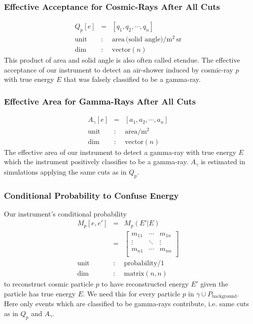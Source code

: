 \documentclass{article}%
\begin{document}
\subsubsection*{Effective Acceptance for Cosmic-Rays After All Cuts}
\begin{eqnarray*}
Q_p[e] &=& [q_1, q_2, \cdots, q_n]\\
\text{unit} &:& \text{area} \, \text{(solid angle)} / \text{m}^{2}\,\text{sr}\\
\text{dim} &:& \text{vector}(n)
\end{eqnarray*}
%
This product of area and solid angle is also often called etendue.
%
The effective acceptance of our instrument to detect an air-shower induced by cosmic-ray $p$ with true energy $E$ that was falsely classified to be a gamma-ray.
%
\subsubsection*{Effective Area for Gamma-Rays After All Cuts}
\begin{eqnarray*}
A_\gamma[e] &=& [a_1, a_2, \cdots, a_n]\\
\text{unit} &:& \text{area} / \text{m}^{2}\\
\text{dim} &:& \text{vector}(n)
\end{eqnarray*}
%
The effective area of our instrument to detect a gamma-ray with true energy $E$ which the instrument positively classifies to be a gamma-ray.
%
$A_\gamma$ is estimated in simulations applying the same cuts as in $Q_p$.
%
\subsubsection*{Conditional Probability to Confuse Energy}
%
Our instrument's conditional probability
%
\begin{eqnarray*}
M_p[e, e'] &=& M_p(E' \vert E)\\
&=&
  \left[ {\begin{array}{ccc}
    m_{11} & \cdots & m_{1n}\\
    \vdots & \ddots & \vdots\\
    m_{n1} & \cdots & m_{nn}\\
  \end{array} } \right]\\
\text{unit} &:& \text{probability}/1\\
\text{dim} &:& \text{matrix}(n,n)
\end{eqnarray*}
%
to reconstruct cosmic particle $p$ to have reconstructed energy $E'$ given the particle has true energy $E$.
%
We need this for every particle $p$ in $\gamma \cup P_\text{background}$.
%
Here only events which are classified to be gamma-rays contribute, i.e. same cuts as in $Q_p$ and $A_\gamma$.
%
\end{document}
